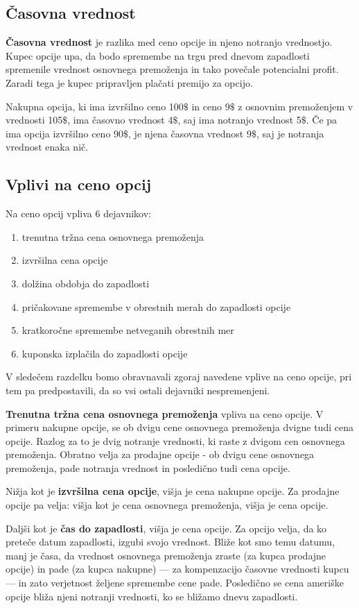 \documentclass[a4paper]{article}
\begin{document}
\subsection{Časovna vrednost}
\textbf{Časovna vrednost} je razlika med ceno opcije in njeno notranjo vrednostjo. Kupec opcije upa, da bodo spremembe na trgu pred
dnevom zapadlosti spremenile vrednost osnovnega premoženja in tako povečale potencialni profit. Zaradi tega je kupec pripravljen plačati
premijo za opcijo. 

Nakupna opcija, ki ima izvršilno ceno 100$\$$ in ceno 9$\$$ z osnovnim premoženjem v vrednosti 105$\$$, ima časovno vrednost 4$\$$,
saj ima notranjo vrednost 5$\$$. Če pa ima opcija izvršilno ceno 90$\$$, je njena časovna vrednost 9$\$$, saj je notranja vrednost enaka nič.

\subsection{Vplivi na ceno opcij}
Na ceno opcij vpliva 6 dejavnikov:
\begin{enumerate}
    \item trenutna tržna cena osnovnega premoženja
    \item izvršilna cena opcije
    \item dolžina obdobja do zapadlosti
    \item pričakovane spremembe v obrestnih merah do zapadlosti opcije
    \item kratkoročne spremembe netveganih obrestnih mer
    \item kuponska izplačila do zapadlosti opcije
\end{enumerate}
V sledečem razdelku bomo obravnavali zgoraj navedene vplive na ceno opcije, pri tem pa predpostavili, da so vsi ostali
dejavniki nespremenjeni.

\textbf{Trenutna tržna cena osnovnega premoženja} vpliva na ceno opcije. V primeru nakupne opcije, se ob 
dvigu cene osnovnega premoženja dvigne tudi cena opcije. Razlog za to je dvig notranje vrednosti,
 ki raste z dvigom cen osnovnega premoženja. Obratno velja za prodajne
opcije - ob dvigu cene osnovnega premoženja, pade notranja vrednost in posledično tudi cena opcije.

Nižja kot je \textbf{izvršilna cena opcije}, višja je cena nakupne opcije. Za prodajne opcije pa velja: višja kot je cena 
osnovnega premoženja, višja je cena opcije.

Daljši kot je \textbf{čas do zapadlosti}, višja je cena opcije. Za opcijo velja, da ko preteče datum zapadlosti, 
izgubi svojo vrednost.
Bliže kot smo temu datumu, manj je časa, da vrednost osnovnega premoženja zraste (za kupca prodajne opcije) in pade (za kupca nakupne) ---
za kompenzacijo časovne vrednosti kupcu --- in zato verjetnost željene spremembe cene pade. Posledično se cena ameriške opcije bliža njeni
notranji vrednosti, ko se bližamo dnevu zapadlosti.
\end{document}
